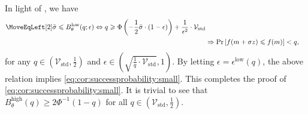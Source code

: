 \documentclass[journal]{IEEEtran}
\renewcommand{\geq}{\geqslant} %
\renewcommand{\leq}{\leqslant} %
\theoremstyle{definition}
\begin{document}
In light of , we have
\begin{equation}
\begin{aligned}[t]
    \label{eq:8}
\MoveEqLeft[2]
\bar\sigma \leq 
B_\theta^\mathrm{low}(q; \epsilon)
\Leftrightarrow
q\geq \Phi\left(-\frac12 \bar\sigma\cdot (1-\epsilon)\right) + \frac{1}{\epsilon^2}\cdot\mathcal{V}_\mathrm{std}
\\
&\Rightarrow
\Pr\left[f(m+\sigma z)\leq f(m)\right] < q
,
\end{aligned}
\end{equation}
for any $q\in\left( \mathcal{V}_\mathrm{std} , \frac{1}{2}\right)$ and $\epsilon\in \left(\sqrt{\frac{1}{q}\cdot\mathcal{V}_\mathrm{std}}, 1\right)$.
By letting $\epsilon = \epsilon^\text{low}(q)$, the above relation implies \eqref{eq:cor:successprobability:small}. This completes the proof of \eqref{eq:cor:successprobability:small}.
It is trivial to see that $B_\theta^\mathrm{high}(q) \geq 2 \Phi^{-1}(1-q)$ for all $q\in\left( \mathcal{V}_\mathrm{std} , \frac{1}{2}\right)$.


\end{document}
